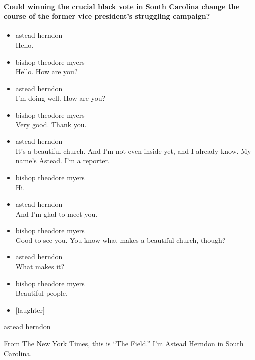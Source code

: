 \hypertarget{could-winning-the-crucial-black-vote-in-south-carolina-change-the-course-of-the-former-vice-presidents-struggling-campaign}{%
\paragraph{Could winning the crucial black vote in South Carolina change
the course of the former vice president's struggling
campaign?}\label{could-winning-the-crucial-black-vote-in-south-carolina-change-the-course-of-the-former-vice-presidents-struggling-campaign}}

\begin{itemize}
\item
  astead herndon\\
  Hello.
\item
  bishop theodore myers\\
  Hello. How are you?
\item
  astead herndon\\
  I'm doing well. How are you?
\item
  bishop theodore myers\\
  Very good. Thank you.
\item
  astead herndon\\
  It's a beautiful church. And I'm not even inside yet, and I already
  know. My name's Astead. I'm a reporter.
\item
  bishop theodore myers\\
  Hi.
\item
  astead herndon\\
  And I'm glad to meet you.
\item
  bishop theodore myers\\
  Good to see you. You know what makes a beautiful church, though?
\item
  astead herndon\\
  What makes it?
\item
  bishop theodore myers\\
  Beautiful people.
\item
  {[}laughter{]}
\end{itemize}

astead herndon

From The New York Times, this is ``The Field.'' I'm Astead Herndon in
South Carolina.

